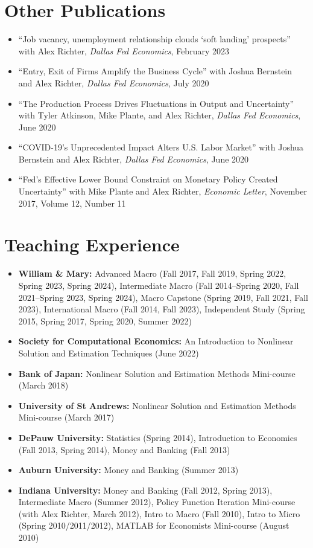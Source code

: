 \documentclass[10pt,letterpaper,en-US]{article}
\begin{document}
\section*{Other Publications}
\begin{itemize}
\item ``Job vacancy, unemployment relationship clouds ‘soft landing’ prospects'' with Alex Richter, \emph{Dallas Fed Economics}, February 2023
\item ``Entry, Exit of Firms Amplify the Business Cycle'' with Joshua Bernstein and Alex Richter, \emph{Dallas Fed Economics}, July 2020
\item ``The Production Process Drives Fluctuations in Output and Uncertainty'' with Tyler Atkinson, Mike Plante, and Alex Richter, \emph{Dallas Fed Economics}, June 2020
\item ``COVID-19’s Unprecedented Impact Alters U.S. Labor Market'' with Joshua Bernstein and Alex Richter, \emph{Dallas Fed Economics}, June 2020
\item ``Fed's Effective Lower Bound Constraint on Monetary Policy Created Uncertainty'' with Mike Plante and Alex Richter, \emph{Economic Letter}, November 2017, Volume 12, Number 11
\end{itemize}

\section*{Teaching Experience}

\begin{itemize}

\item \textbf{William \& Mary:} Advanced Macro (Fall 2017, Fall 2019, Spring 2022, Spring 2023, Spring 2024), Intermediate Macro (Fall 2014--Spring 2020, Fall 2021--Spring 2023, Spring 2024), Macro Capstone (Spring 2019, Fall 2021, Fall 2023), International Macro (Fall 2014, Fall 2023), Independent Study (Spring 2015, Spring 2017, Spring 2020, Summer 2022)
\item \textbf{Society for Computational Economics:} An Introduction to Nonlinear Solution and Estimation Techniques (June 2022)
\item \textbf{Bank of Japan:} Nonlinear Solution and Estimation Methods Mini-course (March 2018)
\item \textbf{University of St Andrews:} Nonlinear Solution and Estimation Methods Mini-course (March 2017)
\item \textbf{DePauw University:} Statistics (Spring 2014), Introduction to Economics (Fall 2013, Spring 2014), Money and Banking (Fall 2013)
\item \textbf{Auburn University:} Money and Banking (Summer 2013)
\item \textbf{Indiana University:} Money and Banking (Fall 2012, Spring 2013), Intermediate Macro (Summer 2012), Policy Function Iteration Mini-course (with Alex Richter, March 2012), Intro to Macro (Fall 2010), Intro to Micro (Spring 2010/2011/2012), MATLAB for Economists Mini-course (August 2010)
\end{itemize}
\end{document}
